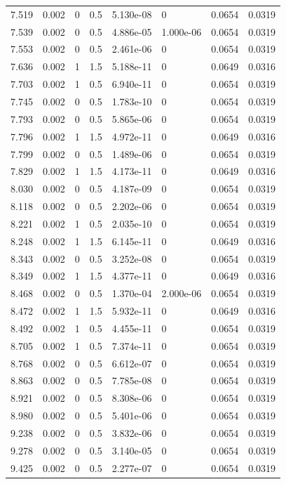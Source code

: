 \documentclass[preview]{standalone}
\begin{document}
{{{\begin{tabular}{L{1.2cm}C{1.2cm} C{0.3cm}C{0.5cm} C{1.4cm}C{1.4cm} C{1.4cm}C{1.4cm}}
  7.519  &  0.002  & 0     & 0.5 &  5.130e-08  & 0  & 0.0654 &  0.0319   \\ 
  7.539  &  0.002  & 0     & 0.5 &  4.886e-05  & 1.000e-06  & 0.0654 &  0.0319   \\ 
  7.553  &  0.002  & 0     & 0.5 &  2.461e-06  & 0  & 0.0654 &  0.0319   \\ 
  7.636  &  0.002  & 1     & 1.5 &  5.188e-11  & 0  & 0.0649 &  0.0316   \\ 
  7.703  &  0.002  & 1     & 0.5 &  6.940e-11  & 0  & 0.0654 &  0.0319   \\ 
  7.745  &  0.002  & 0     & 0.5 &  1.783e-10  & 0  & 0.0654 &  0.0319   \\ 
  7.793  &  0.002  & 0     & 0.5 &  5.865e-06  & 0  & 0.0654 &  0.0319   \\ 
  7.796  &  0.002  & 1     & 1.5 &  4.972e-11  & 0  & 0.0649 &  0.0316   \\ 
  7.799  &  0.002  & 0     & 0.5 &  1.489e-06  & 0  & 0.0654 &  0.0319   \\ 
  7.829  &  0.002  & 1     & 1.5 &  4.173e-11  & 0  & 0.0649 &  0.0316   \\ 
  8.030  &  0.002  & 0     & 0.5 &  4.187e-09  & 0  & 0.0654 &  0.0319   \\ 
  8.118  &  0.002  & 0     & 0.5 &  2.202e-06  & 0  & 0.0654 &  0.0319   \\ 
  8.221  &  0.002  & 1     & 0.5 &  2.035e-10  & 0  & 0.0654 &  0.0319   \\ 
  8.248  &  0.002  & 1     & 1.5 &  6.145e-11  & 0  & 0.0649 &  0.0316   \\ 
  8.343  &  0.002  & 0     & 0.5 &  3.252e-08  & 0  & 0.0654 &  0.0319   \\ 
  8.349  &  0.002  & 1     & 1.5 &  4.377e-11  & 0  & 0.0649 &  0.0316   \\ 
  8.468  &  0.002  & 0     & 0.5 &  1.370e-04  & 2.000e-06  & 0.0654 &  0.0319   \\ 
  8.472  &  0.002  & 1     & 1.5 &  5.932e-11  & 0  & 0.0649 &  0.0316   \\ 
  8.492  &  0.002  & 1     & 0.5 &  4.455e-11  & 0  & 0.0654 &  0.0319   \\ 
  8.705  &  0.002  & 1     & 0.5 &  7.374e-11  & 0  & 0.0654 &  0.0319   \\ 
  8.768  &  0.002  & 0     & 0.5 &  6.612e-07  & 0  & 0.0654 &  0.0319   \\ 
  8.863  &  0.002  & 0     & 0.5 &  7.785e-08  & 0  & 0.0654 &  0.0319   \\ 
  8.921  &  0.002  & 0     & 0.5 &  8.308e-06  & 0  & 0.0654 &  0.0319   \\ 
  8.980  &  0.002  & 0     & 0.5 &  5.401e-06  & 0  & 0.0654 &  0.0319   \\ 
  9.238  &  0.002  & 0     & 0.5 &  3.832e-06  & 0  & 0.0654 &  0.0319   \\ 
  9.278  &  0.002  & 0     & 0.5 &  3.140e-05  & 0  & 0.0654 &  0.0319   \\ 
  9.425  &  0.002  & 0     & 0.5 &  2.277e-07  & 0  & 0.0654 &  0.0319   \\ 
\hline 
\end{tabular} 

}}}
\end{document}

